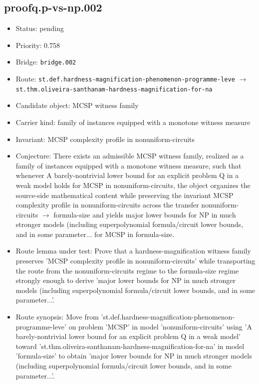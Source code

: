 \documentclass[11pt]{article}
\begin{document}
\subsection*{proofq.p-vs-np.002}
\begin{itemize}[leftmargin=*,itemsep=0.25em]
\item Status: pending
\item Priority: 0.758
\item Bridge: \texttt{bridge.002}
\item Route: \texttt{st.def.hardness-magnification-phenomenon-programme-leve} $\rightarrow$ \texttt{st.thm.oliveira-santhanam-hardness-magnification-for-na}
\item Candidate object: MCSP witness family
\item Carrier kind: family of instances equipped with a monotone witness measure
\item Invariant: MCSP complexity profile in nonuniform-circuits
\item Conjecture: There exists an admissible MCSP witness family, realized as a family of instances equipped with a monotone witness measure, such that whenever A barely-nontrivial lower bound for an explicit problem Q in a weak model holds for MCSP in nonuniform-circuits, the object organizes the source-side mathematical content while preserving the invariant MCSP complexity profile in nonuniform-circuits across the transfer nonuniform-circuits $\rightarrow$  formula-size and yields major lower bounds for NP in much stronger models (including superpolynomial formula/circuit lower bounds, and in some parameter... for MCSP in formula-size.
\item Route lemma under test: Prove that a hardness-magnification witness family preserves 'MCSP complexity profile in nonuniform-circuits' while transporting the route from the nonuniform-circuits regime to the formula-size regime strongly enough to derive 'major lower bounds for NP in much stronger models (including superpolynomial formula/circuit lower bounds, and in some parameter...'.
\item Route synopsis: Move from 'st.def.hardness-magnification-phenomenon-programme-leve' on problem 'MCSP' in model 'nonuniform-circuits' using 'A barely-nontrivial lower bound for an explicit problem Q in a weak model' toward 'st.thm.oliveira-santhanam-hardness-magnification-for-na' in model 'formula-size' to obtain 'major lower bounds for NP in much stronger models (including superpolynomial formula/circuit lower bounds, and in some parameter...'.
\end{itemize}
\end{document}
